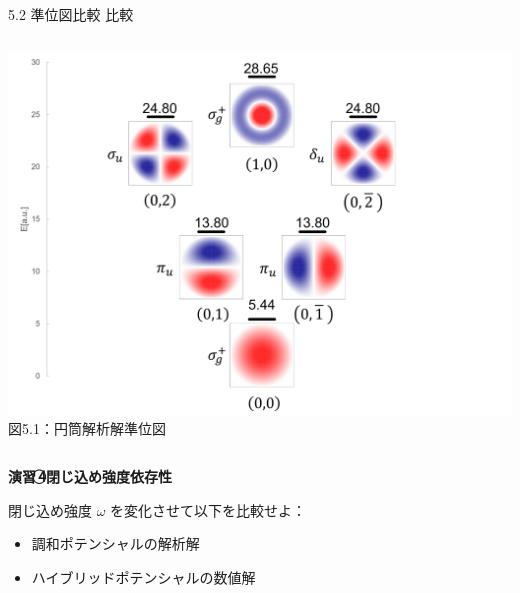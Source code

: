 \documentclass{beamer}
\begin{document}
\begin{frame}{5.2 準位図比較
    比較}
\begin{columns}[t]
          \begin{center}
            \includegraphics[width=1.30\linewidth]{images/円筒準位図.png} \\
            \scriptsize 図5.1：円筒解析解準位図
          \end{center}


          \end{columns}
          

    
    \end{frame}
    
    \begin{frame}{}
      \textbf{演習\,\textcircled{4}\quad 閉じ込め強度依存性}
    
          閉じ込め強度 $\omega$ を変化させて以下を比較せよ：
          \begin{itemize}
            \item 調和ポテンシャルの解析解
            \item ハイブリッドポテンシャルの数値解
          \end{itemize}
          
    
    \end{frame}
    
\end{document}
